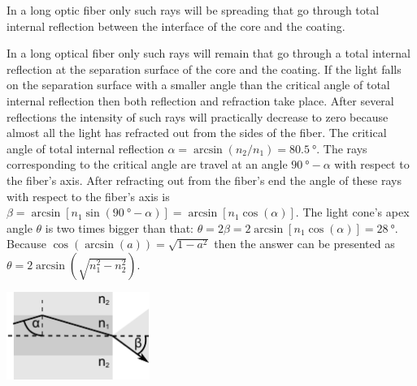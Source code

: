 {\ifEngHint
In a long optic fiber only such rays will be spreading that go through total internal reflection between the interface of the core and the coating.
\fi


\ifEngSolution
In a long optical fiber only such rays will remain that go through a total internal reflection at the separation surface of the core and the coating. If the light falls on the separation surface with a smaller angle than the critical angle of total internal reflection then both reflection and refraction take place. After several reflections the intensity of such rays will practically decrease to zero because almost all the light has refracted out from the sides of the fiber. The critical angle of total internal reflection $\alpha=\arcsin(n_2/n_1)=\SI{80,5}{\degree}$. The rays corresponding to the critical angle are travel at an angle $\SI{90}{\degree}-\alpha$ with respect to the fiber’s axis. After refracting out from the fiber’s end the angle of these rays with respect to the fiber’s axis is $\beta=\arcsin[n_1\sin(\SI{90}{\degree}-\alpha)]=\arcsin[n_1\cos(\alpha)]$. The light cone’s apex angle $\theta$ is two times bigger than that: $\theta=2\beta=2\arcsin[n_1\cos(\alpha)]=\SI{28}{\degree}$. Because $\cos(\arcsin(a))=\sqrt{1-a^2}$ then the answer can be presented as $\theta=2\arcsin(\sqrt{n_1^2-n_2^2})$.
\begin{center}
    \includegraphics[width=0.35\textwidth]{2016-lahg-04-kiud}
\end{center}
\fi
}